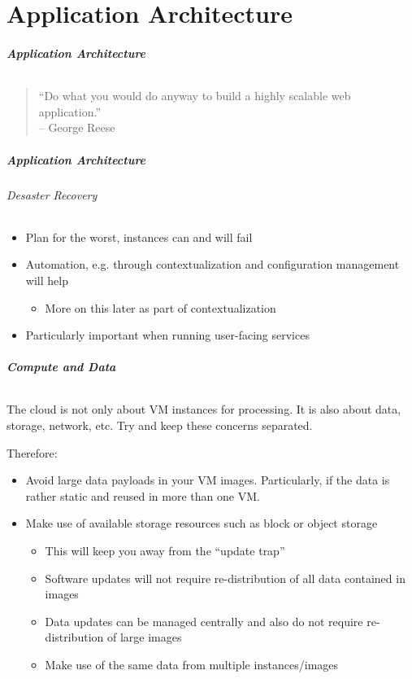 \label{part_architecture}
\part{Application Architecture}

\begin{frame}
\frametitle{Application Architecture}
\framesubtitle{}
\begin{quote}
  ``Do what you would do anyway to build a highly scalable web application.''\\
  \hfill{}-- George Reese
\end{quote}
\end{frame}

\begin{frame}
\frametitle{Application Architecture}
\framesubtitle{Desaster Recovery}
\begin{itemize}
\item Plan for the worst, instances can and will fail
\item Automation, e.g. through contextualization and configuration management will help
  \begin{itemize}
  \item More on this later as part of contextualization
  \end{itemize}
  \item Particularly important when running user-facing services
\end{itemize}
\end{frame}



\begin{frame}
\frametitle{Compute and Data}
\framesubtitle{}
The cloud is not only about VM instances for processing. It is
also about data, storage, network, etc. Try and keep these concerns
separated.

Therefore:
\begin{itemize}
\item Avoid large data payloads in your VM images. Particularly, if
  the data is rather static and reused in more than one VM.
\item Make use of available storage resources such as block or object
  storage
  \begin{itemize}
  \item This will keep you away from the ``update trap''
  \item Software updates will not require re-distribution of all data
    contained in images
  \item Data updates can be managed centrally and also do not require
    re-distribution of large images
  \item Make use of the same data from multiple instances/images
  \end{itemize}
\end{itemize}
\end{frame}

